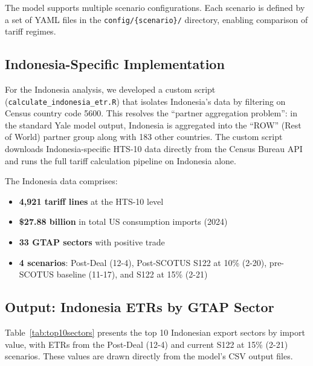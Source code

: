 \documentclass[12pt,a4paper]{article}
\begin{document}
The model supports multiple scenario configurations. Each scenario is defined by a set of YAML files in the \texttt{config/\{scenario\}/} directory, enabling comparison of tariff regimes.

\subsection{Indonesia-Specific Implementation}

For the Indonesia analysis, we developed a custom script (\texttt{calculate\_indonesia\_etr.R}) that isolates Indonesia's data by filtering on Census country code 5600. This resolves the ``partner aggregation problem'': in the standard Yale model output, Indonesia is aggregated into the ``ROW'' (Rest of World) partner group along with 183 other countries. The custom script downloads Indonesia-specific HTS-10 data directly from the Census Bureau API and runs the full tariff calculation pipeline on Indonesia alone.

The Indonesia data comprises:
\begin{itemize}
    \item \textbf{4,921 tariff lines} at the HTS-10 level
    \item \textbf{\$27.88 billion} in total US consumption imports (2024)
    \item \textbf{33 GTAP sectors} with positive trade
    \item \textbf{4 scenarios}: Post-Deal (12-4), Post-SCOTUS S122 at 10\% (2-20), pre-SCOTUS baseline (11-17), and S122 at 15\% (2-21)
\end{itemize}

\subsection{Output: Indonesia ETRs by GTAP Sector}

Table~\ref{tab:top10sectors} presents the top 10 Indonesian export sectors by import value, with ETRs from the Post-Deal (12-4) and current S122 at 15\% (2-21) scenarios. These values are drawn directly from the model's CSV output files.
\end{document}
